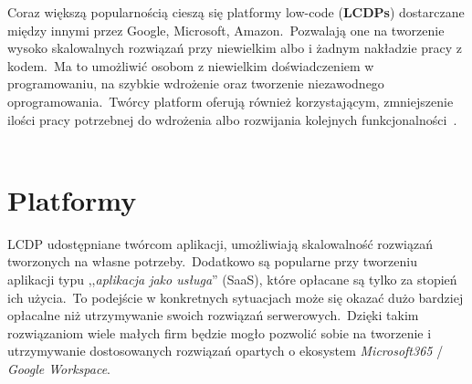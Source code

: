 Coraz większą popularnością cieszą się platformy low-code  (\textbf{LCDPs}) dostarczane między innymi przez Google, Microsoft, Amazon.\ Pozwalają one na tworzenie wysoko skalowalnych rozwiązań przy niewielkim albo i żadnym nakładzie pracy z kodem.\ Ma to umożliwić osobom z niewielkim doświadczeniem w programowaniu, na szybkie wdrożenie oraz tworzenie niezawodnego oprogramowania.\ Twórcy platform oferują również korzystającym, zmniejszenie ilości pracy potrzebnej do wdrożenia albo rozwijania kolejnych funkcjonalności~\cite{Bock2021, Hirzel2022}.
\\ \\
\section{Platformy}
LCDP udostępniane twórcom aplikacji, umożliwiają skalowalność rozwiązań tworzonych na własne potrzeby.\ Dodatkowo są popularne przy tworzeniu aplikacji typu ,,\textit{aplikacja jako usługa}''  (SaaS), które opłacane są tylko za stopień ich użycia.\ To podejście w konkretnych sytuacjach może się okazać dużo bardziej opłacalne niż utrzymywanie swoich rozwiązań serwerowych.\ Dzięki takim rozwiązaniom wiele małych firm będzie mogło pozwolić sobie na tworzenie i utrzymywanie dostosowanych rozwiązań opartych o ekosystem \textit{Microsoft365} / \textit{Google Workspace}.


